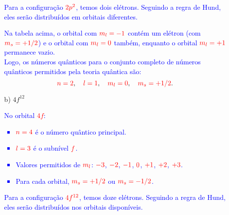 \documentclass[a4paper, 12pt]{article}
\begin{document}
\begin{enumerate}
\begin{enumerate}
		            \textcolor{blue}{Para a configuração \( \textcolor{red}{2p^2} \), temos dois elétrons. Seguindo a regra de Hund, eles serão distribuídos em orbitais diferentes.}
		            
		            
		            
		            \textcolor{blue}{Na tabela acima, o orbital com \( \textcolor{red}{m_l = -1} \) contém um elétron (com \( \textcolor{red}{m_s = +1/2} \)) e o orbital com \( \textcolor{red}{m_l = 0} \) também, enquanto o orbital \( \textcolor{red}{m_l = +1} \) permanece vazio.}\\[2mm]
		            
		            \textcolor{blue}{Logo, os números quânticos para o conjunto completo de números quânticos permitidos pela teoria quântica são:}
		            \[
			            \textcolor{red}{n = 2}, \quad 
			            \textcolor{red}{l = 1}, \quad 
			            \textcolor{red}{m_l = 0}, \quad 
			            \textcolor{red}{m_s = +1/2}.
		            \]
		            
		      \item[b)] \(4f^{12}\)
		            
		            \textcolor{blue}{No orbital \textcolor{red}{\(4f\)}:}
		            \textcolor{blue}{
			            \begin{itemize}
				            \item \textcolor{blue}{\( \textcolor{red}{n = 4} \) é o número quântico principal.}
				            \item \textcolor{blue}{\( \textcolor{red}{l = 3} \) é o subnível \( \textcolor{red}{f} \).}
				            \item \textcolor{blue}{Valores permitidos de \( \textcolor{red}{m_l} \): \( \textcolor{red}{-3} \), \( \textcolor{red}{-2} \), \( \textcolor{red}{-1} \), \( \textcolor{red}{0} \), \( \textcolor{red}{+1} \), \( \textcolor{red}{+2} \), \( \textcolor{red}{+3} \).}
				            \item \textcolor{blue}{Para cada orbital, \( \textcolor{red}{m_s = +1/2} \) ou \( \textcolor{red}{m_s = -1/2} \).}
			            \end{itemize}
		            }
		            
		            \textcolor{blue}{Para a configuração \( \textcolor{red}{4f^{12}} \), temos doze elétrons. Seguindo a regra de Hund, eles serão distribuídos nos orbitais disponíveis.}
		            
		            
		            

\end{enumerate}
\end{enumerate}
\end{document}
